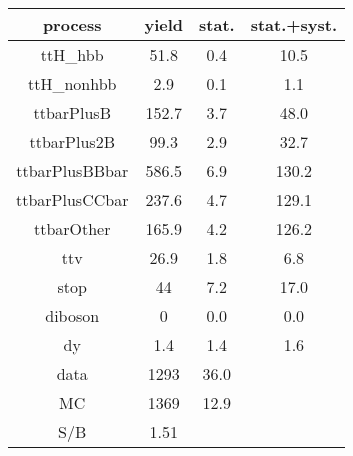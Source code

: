 \begin{tabular}{cccc}
\hline
    process     &  yield  &  stat.  &  stat.+syst.  \\
\hline
    ttH\_hbb     &  51.8   &   0.4   &     10.5      \\
   ttH\_nonhbb   &   2.9   &   0.1   &      1.1      \\
   ttbarPlusB   &  152.7  &   3.7   &     48.0      \\
  ttbarPlus2B   &  99.3   &   2.9   &     32.7      \\
 ttbarPlusBBbar &  586.5  &   6.9   &     130.2     \\
 ttbarPlusCCbar &  237.6  &   4.7   &     129.1     \\
   ttbarOther   &  165.9  &   4.2   &     126.2     \\
      ttv       &  26.9   &   1.8   &      6.8      \\
      stop      &   44    &   7.2   &     17.0      \\
    diboson     &    0    &   0.0   &      0.0      \\
       dy       &   1.4   &   1.4   &      1.6      \\
      data      &  1293   &  36.0   &               \\
       MC       &  1369   &  12.9   &               \\
      S/B       &  1.51   &         &               \\
\hline
\end{tabular}